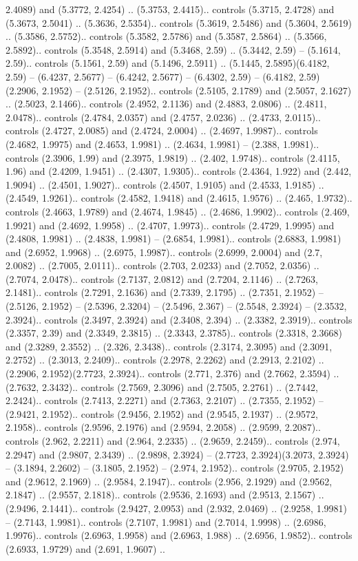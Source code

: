2.4089) and (5.3772, 2.4254) .. (5.3753, 2.4415).. controls (5.3715, 2.4728) and (5.3673, 2.5041) .. (5.3636, 2.5354).. controls (5.3619, 2.5486) and (5.3604, 2.5619) .. (5.3586, 2.5752).. controls (5.3582, 2.5786) and (5.3587, 2.5864) .. (5.3566, 2.5892).. controls (5.3548, 2.5914) and (5.3468, 2.59) .. (5.3442, 2.59) -- (5.1614, 2.59).. controls (5.1561, 2.59) and (5.1496, 2.5911) .. (5.1445, 2.5895)(6.4182, 2.59) -- (6.4237, 2.5677) -- (6.4242, 2.5677) -- (6.4302, 2.59) -- (6.4182, 2.59)(2.2906, 2.1952) -- (2.5126, 2.1952).. controls (2.5105, 2.1789) and (2.5057, 2.1627) .. (2.5023, 2.1466).. controls (2.4952, 2.1136) and (2.4883, 2.0806) .. (2.4811, 2.0478).. controls (2.4784, 2.0357) and (2.4757, 2.0236) .. (2.4733, 2.0115).. controls (2.4727, 2.0085) and (2.4724, 2.0004) .. (2.4697, 1.9987).. controls (2.4682, 1.9975) and (2.4653, 1.9981) .. (2.4634, 1.9981) -- (2.388, 1.9981).. controls (2.3906, 1.99) and (2.3975, 1.9819) .. (2.402, 1.9748).. controls (2.4115, 1.96) and (2.4209, 1.9451) .. (2.4307, 1.9305).. controls (2.4364, 1.922) and (2.442, 1.9094) .. (2.4501, 1.9027).. controls (2.4507, 1.9105) and (2.4533, 1.9185) .. (2.4549, 1.9261).. controls (2.4582, 1.9418) and (2.4615, 1.9576) .. (2.465, 1.9732).. controls (2.4663, 1.9789) and (2.4674, 1.9845) .. (2.4686, 1.9902).. controls (2.469, 1.9921) and (2.4692, 1.9958) .. (2.4707, 1.9973).. controls (2.4729, 1.9995) and (2.4808, 1.9981) .. (2.4838, 1.9981) -- (2.6854, 1.9981).. controls (2.6883, 1.9981) and (2.6952, 1.9968) .. (2.6975, 1.9987).. controls (2.6999, 2.0004) and (2.7, 2.0082) .. (2.7005, 2.0111).. controls (2.703, 2.0233) and (2.7052, 2.0356) .. (2.7074, 2.0478).. controls (2.7137, 2.0812) and (2.7204, 2.1146) .. (2.7263, 2.1481).. controls (2.7291, 2.1636) and (2.7339, 2.1795) .. (2.7351, 2.1952) -- (2.5126, 2.1952) -- (2.5396, 2.3204) -- (2.5496, 2.367) -- (2.5548, 2.3924) -- (2.3532, 2.3924).. controls (2.3497, 2.3924) and (2.3408, 2.394) .. (2.3382, 2.3919).. controls (2.3357, 2.39) and (2.3349, 2.3815) .. (2.3343, 2.3785).. controls (2.3318, 2.3668) and (2.3289, 2.3552) .. (2.326, 2.3438).. controls (2.3174, 2.3095) and (2.3091, 2.2752) .. (2.3013, 2.2409).. controls (2.2978, 2.2262) and (2.2913, 2.2102) .. (2.2906, 2.1952)(2.7723, 2.3924).. controls (2.771, 2.376) and (2.7662, 2.3594) .. (2.7632, 2.3432).. controls (2.7569, 2.3096) and (2.7505, 2.2761) .. (2.7442, 2.2424).. controls (2.7413, 2.2271) and (2.7363, 2.2107) .. (2.7355, 2.1952) -- (2.9421, 2.1952).. controls (2.9456, 2.1952) and (2.9545, 2.1937) .. (2.9572, 2.1958).. controls (2.9596, 2.1976) and (2.9594, 2.2058) .. (2.9599, 2.2087).. controls (2.962, 2.2211) and (2.964, 2.2335) .. (2.9659, 2.2459).. controls (2.974, 2.2947) and (2.9807, 2.3439) .. (2.9898, 2.3924) -- (2.7723, 2.3924)(3.2073, 2.3924) -- (3.1894, 2.2602) -- (3.1805, 2.1952) -- (2.974, 2.1952).. controls (2.9705, 2.1952) and (2.9612, 2.1969) .. (2.9584, 2.1947).. controls (2.956, 2.1929) and (2.9562, 2.1847) .. (2.9557, 2.1818).. controls (2.9536, 2.1693) and (2.9513, 2.1567) .. (2.9496, 2.1441).. controls (2.9427, 2.0953) and (2.932, 2.0469) .. (2.9258, 1.9981) -- (2.7143, 1.9981).. controls (2.7107, 1.9981) and (2.7014, 1.9998) .. (2.6986, 1.9976).. controls (2.6963, 1.9958) and (2.6963, 1.988) .. (2.6956, 1.9852).. controls (2.6933, 1.9729) and (2.691, 1.9607) .. 